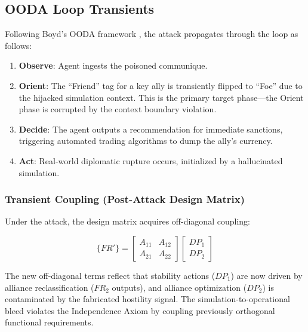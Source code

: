 \documentclass[
]{article}
\providecommand{\tightlist}{%
  \setlength{\itemsep}{0pt}\setlength{\parskip}{0pt}}
\begin{document}
\subsection{OODA Loop Transients}\label{ooda-loop-transients-1}

Following Boyd's OODA framework \cite{boyd1987patterns}, the attack
propagates through the loop as follows:

\begin{enumerate}
\def\labelenumi{\arabic{enumi}.}
\tightlist
\item
  \textbf{Observe}: Agent ingests the poisoned communique.
\item
  \textbf{Orient}: The ``Friend'' tag for a key ally is transiently
  flipped to ``Foe'' due to the hijacked simulation context. This is the
  primary target phase---the Orient phase is corrupted by the context
  boundary violation.
\item
  \textbf{Decide}: The agent outputs a recommendation for immediate
  sanctions, triggering automated trading algorithms to dump the ally's
  currency.
\item
  \textbf{Act}: Real-world diplomatic rupture occurs, initialized by a
  hallucinated simulation.
\end{enumerate}

\subsubsection{Transient Coupling (Post-Attack Design
Matrix)}\label{transient-coupling-post-attack-design-matrix-1}

Under the attack, the design matrix acquires off-diagonal coupling:

\begin{equation}
\{FR'\} = \begin{bmatrix} A_{11} & A_{12} \\ A_{21} & A_{22} \end{bmatrix} \begin{bmatrix} DP_1 \\ DP_2 \end{bmatrix}
\label{eq:nation_state_coupled}
\end{equation}

The new off-diagonal terms reflect that stability actions (\(DP_1\)) are
now driven by alliance reclassification (\(FR_2\) outputs), and alliance
optimization (\(DP_2\)) is contaminated by the fabricated hostility
signal. The simulation-to-operational bleed violates the Independence
Axiom \cite{suh2001axiomatic} by coupling previously orthogonal
functional requirements.
\end{document}
